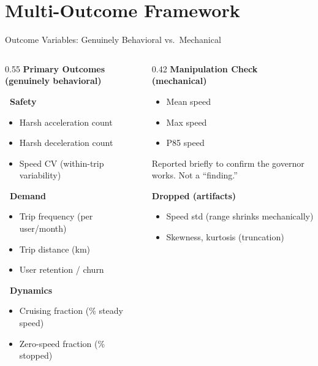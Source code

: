\documentclass[aspectratio=169, 11pt]{beamer}
\begin{document}
\section{Multi-Outcome Framework}

\begin{frame}{Outcome Variables: Genuinely Behavioral vs.\ Mechanical}
\small
\begin{columns}[T]
\begin{column}{0.55\textwidth}
\textbf{\color{AccentGreen}Primary Outcomes (genuinely behavioral)}
\vspace{0.1cm}

\textbf{\color{PhaseRed}\faShieldAlt~Safety}
\begin{itemize}
\item Harsh acceleration count
\item Harsh deceleration count
\item Speed CV (within-trip variability)
\end{itemize}

\textbf{\color{PhaseBlue}\faChartLine~Demand}
\begin{itemize}
\item Trip frequency (per user/month)
\item Trip distance (km)
\item User retention / churn
\end{itemize}

\textbf{\color{AccentGreen}\faTachometerAlt~Dynamics}
\begin{itemize}
\item Cruising fraction (\% steady speed)
\item Zero-speed fraction (\% stopped)
\end{itemize}
\end{column}
\begin{column}{0.42\textwidth}
\textbf{\color{gray}Manipulation Check (mechanical)}
\begin{itemize}
\item[\color{gray}\faCheck] Mean speed
\item[\color{gray}\faCheck] Max speed
\item[\color{gray}\faCheck] P85 speed
\end{itemize}
{\footnotesize\color{gray} Reported briefly to confirm the governor works. Not a ``finding.''}

\vspace{0.4cm}
\textbf{\color{PhaseRed}Dropped (artifacts)}
\begin{itemize}
\item[\color{PhaseRed}\faTimes] Speed std (range shrinks mechanically)
\item[\color{PhaseRed}\faTimes] Skewness, kurtosis (truncation)
\end{itemize}
\end{column}
\end{columns}
\end{frame}
\end{document}
